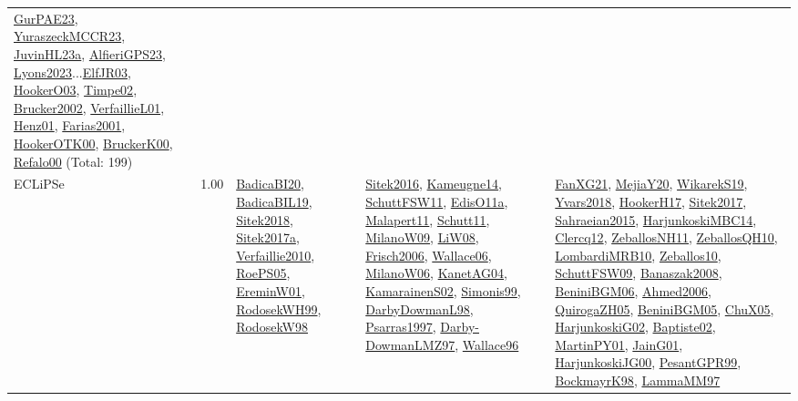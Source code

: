{\begin{longtable}{p{3cm}r>{\raggedright\arraybackslash}p{6cm}>{\raggedright\arraybackslash}p{6cm}>{\raggedright\arraybackslash}p{8cm}}
\hyperref[detail:GurPAE23]{GurPAE23}, \hyperref[detail:YuraszeckMCCR23]{YuraszeckMCCR23}, \hyperref[detail:JuvinHL23a]{JuvinHL23a}, \hyperref[detail:AlfieriGPS23]{AlfieriGPS23}, \hyperref[detail:Lyons2023]{Lyons2023}...\hyperref[detail:ElfJR03]{ElfJR03}, \hyperref[detail:HookerO03]{HookerO03}, \hyperref[detail:Timpe02]{Timpe02}, \hyperref[detail:Brucker2002]{Brucker2002}, \hyperref[detail:VerfaillieL01]{VerfaillieL01}, \hyperref[detail:Henz01]{Henz01}, \hyperref[detail:Farias2001]{Farias2001}, \hyperref[detail:HookerOTK00]{HookerOTK00}, \hyperref[detail:BruckerK00]{BruckerK00}, \hyperref[detail:Refalo00]{Refalo00} (Total: 199)\\
\index{ECLiPSe}\index{CPSystems!ECLiPSe}ECLiPSe &  1.00 & \hyperref[detail:BadicaBI20]{BadicaBI20}, \hyperref[detail:BadicaBIL19]{BadicaBIL19}, \hyperref[detail:Sitek2018]{Sitek2018}, \hyperref[detail:Sitek2017a]{Sitek2017a}, \hyperref[detail:Verfaillie2010]{Verfaillie2010}, \hyperref[detail:RoePS05]{RoePS05}, \hyperref[detail:EreminW01]{EreminW01}, \hyperref[detail:RodosekWH99]{RodosekWH99}, \hyperref[detail:RodosekW98]{RodosekW98} & \hyperref[detail:Sitek2016]{Sitek2016}, \hyperref[detail:Kameugne14]{Kameugne14}, \hyperref[detail:SchuttFSW11]{SchuttFSW11}, \hyperref[detail:EdisO11a]{EdisO11a}, \hyperref[detail:Malapert11]{Malapert11}, \hyperref[detail:Schutt11]{Schutt11}, \hyperref[detail:MilanoW09]{MilanoW09}, \hyperref[detail:LiW08]{LiW08}, \hyperref[detail:Frisch2006]{Frisch2006}, \hyperref[detail:Wallace06]{Wallace06}, \hyperref[detail:MilanoW06]{MilanoW06}, \hyperref[detail:KanetAG04]{KanetAG04}, \hyperref[detail:KamarainenS02]{KamarainenS02}, \hyperref[detail:Simonis99]{Simonis99}, \hyperref[detail:DarbyDowmanL98]{DarbyDowmanL98}, \hyperref[detail:Psarras1997]{Psarras1997}, \hyperref[detail:Darby-DowmanLMZ97]{Darby-DowmanLMZ97}, \hyperref[detail:Wallace96]{Wallace96} & \hyperref[detail:FanXG21]{FanXG21}, \hyperref[detail:MejiaY20]{MejiaY20}, \hyperref[detail:WikarekS19]{WikarekS19}, \hyperref[detail:Yvars2018]{Yvars2018}, \hyperref[detail:HookerH17]{HookerH17}, \hyperref[detail:Sitek2017]{Sitek2017}, \hyperref[detail:Sahraeian2015]{Sahraeian2015}, \hyperref[detail:HarjunkoskiMBC14]{HarjunkoskiMBC14}, \hyperref[detail:Clercq12]{Clercq12}, \hyperref[detail:ZeballosNH11]{ZeballosNH11}, \hyperref[detail:ZeballosQH10]{ZeballosQH10}, \hyperref[detail:LombardiMRB10]{LombardiMRB10}, \hyperref[detail:Zeballos10]{Zeballos10}, \hyperref[detail:SchuttFSW09]{SchuttFSW09}, \hyperref[detail:Banaszak2008]{Banaszak2008}, \hyperref[detail:BeniniBGM06]{BeniniBGM06}, \hyperref[detail:Ahmed2006]{Ahmed2006}, \hyperref[detail:QuirogaZH05]{QuirogaZH05}, \hyperref[detail:BeniniBGM05]{BeniniBGM05}, \hyperref[detail:ChuX05]{ChuX05}, \hyperref[detail:HarjunkoskiG02]{HarjunkoskiG02}, \hyperref[detail:Baptiste02]{Baptiste02}, \hyperref[detail:MartinPY01]{MartinPY01}, \hyperref[detail:JainG01]{JainG01}, \hyperref[detail:HarjunkoskiJG00]{HarjunkoskiJG00}, \hyperref[detail:PesantGPR99]{PesantGPR99}, \hyperref[detail:BockmayrK98]{BockmayrK98}, \hyperref[detail:LammaMM97]{LammaMM97}\\

\end{longtable}}
